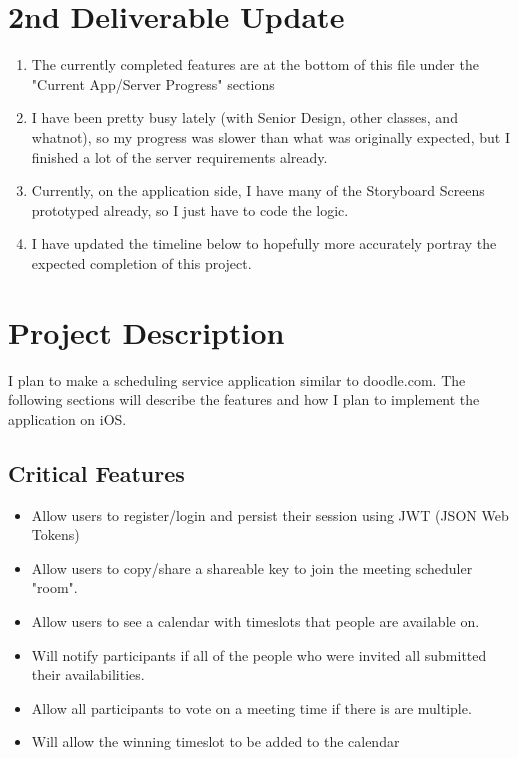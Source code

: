 \documentclass[11pt]{article}
\author{Andrew Chen}
\date{\today}
\title{}
\begin{document}
\tableofcontents

\section{2nd Deliverable Update}
\label{sec:orgc256b8f}

\begin{enumerate}
\item The currently completed features are at the bottom of this file under the "Current App/Server Progress" sections
\item I have been pretty busy lately (with Senior Design, other classes, and whatnot), so my progress was slower than what was originally expected, but I finished a lot of the server requirements already.
\item Currently, on the application side, I have many of the Storyboard Screens prototyped already, so I just have to code the logic.
\item I have updated the timeline below to hopefully more accurately portray the expected completion of this project.
\end{enumerate}

\section{Project Description}
\label{sec:orgc6e8d16}

I plan to make a scheduling service application similar to doodle.com. The following sections will
describe the features and how I plan to implement the application on iOS.

\subsection{Critical Features}
\label{sec:org1c66637}

\begin{itemize}
\item Allow users to register/login and persist their session using JWT (JSON Web Tokens)
\item Allow users to copy/share a shareable key to join the meeting scheduler "room".
\item Allow users to see a calendar with timeslots that people are available on.
\item Will notify participants if all of the people who were invited all submitted their availabilities.
\item Allow all participants to vote on a meeting time if there is are multiple.
\item Will allow the winning timeslot to be added to the calendar
\end{itemize}
\end{document}
